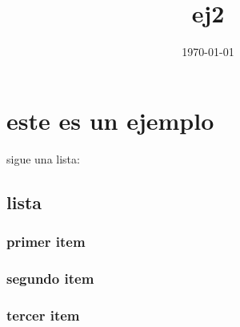 \documentclass[11pt]{article}
\date{\today}
\title{ej2}
\begin{document}
\maketitle
\tableofcontents

\section{este es un ejemplo}
\label{sec-1}
sigue una lista:

\subsection{lista}
\label{sec-1-1}
\subsubsection{primer item}
\label{sec-1-1-1}
\subsubsection{segundo item}
\label{sec-1-1-2}
\subsubsection{tercer item}
\label{sec-1-1-3}
\end{document}
